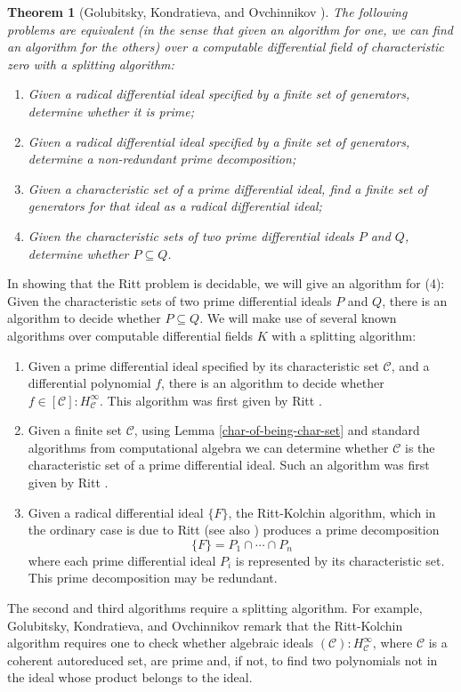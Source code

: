 \documentclass[12pt]{amsart}
\newtheorem{theorem}{Theorem}[section]
\theoremstyle{definition}
\numberwithin{subcase}{cases}
\theoremstyle{remark}
\newcommand{\mc}[1]{\mathcal{#1}}
\begin{document}
\begin{theorem}[Golubitsky, Kondratieva, and Ovchinnikov \cite{GolubitskyKondratievaOvchinnikov09}]
    The following problems are equivalent (in the sense that given an algorithm for one, we can find an algorithm for the others) over a computable differential field of characteristic zero with a splitting algorithm:
    \begin{enumerate}
        \item Given a radical differential ideal specified by a finite set of generators, determine whether it is prime;
        \item Given a radical differential ideal specified by a finite set of generators, determine a non-redundant prime decomposition;
        \item Given a characteristic set of a prime differential ideal, find a finite set of generators for that ideal as a radical differential ideal;
        \item Given the characteristic sets of two prime differential ideals $P$ and $Q$, determine whether $P \subseteq Q$.
    \end{enumerate}
\end{theorem}

In showing that the Ritt problem is decidable, we will give an algorithm for (4): Given the characteristic sets of two prime differential ideals $P$ and $Q$, there is an algorithm to decide whether $P \subseteq Q$. We will make use of several known algorithms over computable differential fields $K$ with a splitting algorithm:
\begin{enumerate}
    \item Given a prime differential ideal specified by its characteristic set $\mc{C}$, and a differential polynomial $f$, there is an algorithm to decide whether $f \in [\mc{C}] : H_{\mc{C}}^\infty$. This algorithm was first given by Ritt \cite[Chapter V §7]{Ritt50}.
    \item Given a finite set $\mc{C}$, using Lemma \ref{char-of-being-char-set} and standard algorithms from computational algebra we can determine whether $\mc{C}$ is the characteristic set of a prime differential ideal. Such an algorithm was first given by Ritt \cite[Chapter V \S 1]{Ritt50}.
    \item Given a radical differential ideal $\{ F \}$, the Ritt-Kolchin algorithm, which in the ordinary case is due to Ritt \cite[Chapter V \S 5]{Ritt50} (see also \cite{Kolchin73,Sit02,KondratievaLevinMikhalevPankratiev99}) produces a prime decomposition
    \[ \{ F \} = P_1 \cap \cdots \cap P_n\]
    where each prime differential ideal $P_i$ is represented by its characteristic set. This prime decomposition may be redundant. 
\end{enumerate}
The second and third algorithms require a splitting algorithm. For example, Golubitsky, Kondratieva, and Ovchinnikov \cite{GolubitskyKondratievaOvchinnikov09} remark that the Ritt-Kolchin algorithm requires one to check whether algebraic ideals $(\mc{C}):H_{\mc{C}}^\infty$, where $\mc{C}$ is a coherent autoreduced set, are prime and, if not, to find two polynomials not in the ideal whose product belongs to the ideal.
\end{document}
